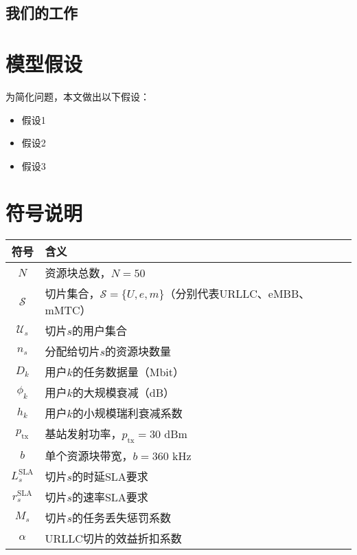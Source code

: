 \documentclass[withoutpreface,bwprint]{cumcmthesis}
\begin{document}

\subsection{我们的工作}


\section{模型假设}

为简化问题，本文做出以下假设：

\begin{itemize}[itemindent=2em]
\item 假设1
\item 假设2
\item 假设3
\end{itemize}

\section{符号说明}


\begin{table}[H]
\centering
\begin{tabular}{cl}
\hline
符号 & 含义 \\
\hline
$N$ & 资源块总数，$N = 50$ \\
$\mathcal{S}$ & 切片集合，$\mathcal{S} = \{U, e, m\}$（分别代表URLLC、eMBB、mMTC） \\
$\mathcal{U}_s$ & 切片$s$的用户集合 \\
$n_s$ & 分配给切片$s$的资源块数量 \\
$D_k$ & 用户$k$的任务数据量（Mbit） \\
$\phi_{k}$ & 用户$k$的大规模衰减（dB） \\
$h_{k}$ & 用户$k$的小规模瑞利衰减系数 \\
$p_{\text{tx}}$ & 基站发射功率，$p_{\text{tx}} = 30$ dBm \\
$b$ & 单个资源块带宽，$b = 360$ kHz \\
$L_s^{\text{SLA}}$ & 切片$s$的时延SLA要求 \\
$r_s^{\text{SLA}}$ & 切片$s$的速率SLA要求 \\
$M_s$ & 切片$s$的任务丢失惩罚系数 \\
$\alpha$ & URLLC切片的效益折扣系数 \\
\hline
\end{tabular}
\end{table}
\end{document}
